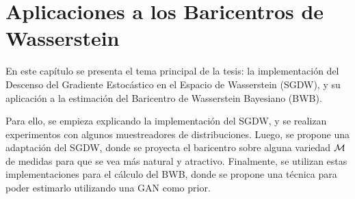
\chapter{Aplicaciones a los Baricentros de Wasserstein}\label{chap:app-bar-wass}

En este capítulo se presenta el tema principal de la tesis: la implementación del Descenso del Gradiente Estocástico en el Espacio de Wasserstein (SGDW), y su aplicación a la estimación del Baricentro de Wasserstein Bayesiano (BWB).

Para ello, se empieza explicando la implementación del SGDW, y se realizan experimentos con algunos muestreadores de distribuciones. Luego, se propone una adaptación del SGDW, donde se proyecta el baricentro sobre alguna variedad $\operatorname{\mathcal{M}}$ de medidas para que se vea más natural y atractivo. Finalmente, se utilizan estas implementaciones para el cálculo del BWB, donde se propone una técnica para poder estimarlo utilizando una GAN como prior.




